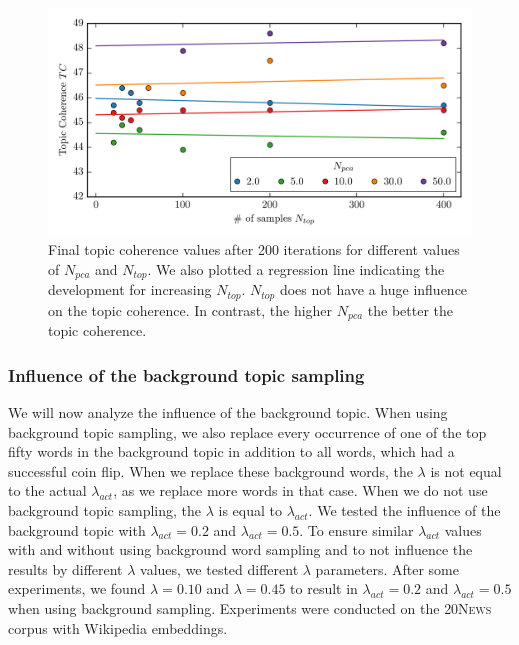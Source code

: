 \documentclass[
        a4paper,
        titlepage,
        twoside,
        parskip,
        numbers=noenddot
        ]{scrbook}
\theoremstyle{break}
\begin{document}
\begin{figure}
       \centering
       \includegraphics[width=\textwidth]{figures/welda_gaussian_pca_samples.png}
       \caption{Final topic coherence values after 200 iterations for different values of $N_{pca}$ and $N_{top}$. We also plotted a regression line indicating the development for increasing $N_{top}$. $N_{top}$ does not have a huge influence on the topic coherence. In contrast, the higher $N_{pca}$ the better the topic coherence.}
       \label{fig:welda_gaussian_pca_samples}
\end{figure}


\subsubsection{Influence of the background topic sampling}

We will now analyze the influence of the background topic.
When using background topic sampling, we also replace every occurrence of one of the top fifty words in the background topic in addition to all words, which had a successful coin flip.
When we replace these background words, the $\lambda$ is not equal to the actual $\lambda_{act}$, as we replace more words in that case.
When we do not use background topic sampling, the $\lambda$ is equal to $\lambda_{act}$.
We tested the influence of the background topic with $\lambda_{act} = 0.2$ and $\lambda_{act} = 0.5$.
To ensure similar $\lambda_{act}$ values with and without using background word sampling and to not influence the results by different $\lambda$ values, we tested different $\lambda$ parameters.
After some experiments, we found $\lambda = 0.10$ and $\lambda = 0.45$ to result in $\lambda_{act} = 0.2$ and $\lambda_{act} = 0.5$ when using background sampling.
Experiments were conducted on the \textsc{20News} corpus with Wikipedia embeddings.
\end{document}
